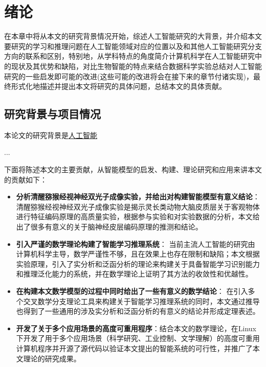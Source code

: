 

\chapter{绪论}
\label{cha:intro}

在本章中将从本文的研究背景情况开始，综述人工智能研究的大背景，并介绍本文要研究的学习和推理问题在人工智能领域对应的位置以及和其他人工智能研究分支方向的联系和区别，特别地，从学科特点的角度简介计算机科学在人工智能研究中的现状及其优势和缺陷，对比生物智能的特点来结合数据科学实验总结对人工智能研究的一些启发即可能的改进(这些可能的改进将会在接下来的章节付诸实现)，最终形式化地描述并提出本文将研究的具体问题，总结本文的具体贡献。


  
\section{研究背景与项目情况}
本论文的研究背景是\underline{人工智能}

...

下面将陈述本文的主要贡献，从智能模型的启发、构建、理论研究和应用来讲本文的贡献如下：

\begin{itemize}
  \item \textbf{分析清醒猕猴经视神经双光子成像实验，并给出对构建智能模型有意义结论}：清醒猕猴经视神经双光子成像实验是揭示灵长类动物大脑皮质层关于客观物体进行特征编码原理的高质量实验，根据参与实验和对实验数据的分析，本文给出了很多有意义的关于脑神经皮层编码原理的推测和结论。
  \item \textbf{引入严谨的数学理论构建了智能学习推理系统}： 当前主流人工智能的研究由计算机科学主导，数学严谨性不够，且在效果上也存在限制和缺陷；本文根据实验原理，引入了实分析和泛函分析的理论来构建关于具备智能学习识别能力和推理泛化能力的系统，并在数学理论上证明了其方法的收敛性和优越性。
  \item \textbf{在构建本文数学模型的过程中同时给出了一些有意义的数学结论}： 在引入多个交叉数学分支理论工具来构建关于智能学习推理系统的同时，本文通过推导也得到了一些通用的涉及实分析和泛函分析的有意义的结论并形成定理表述。
  \item \textbf{开发了关于多个应用场景的高度可重用程序}：结合本文的数学理论，在Linux下开发了用于多个应用场景（科学研究、工业控制、文学理解）的高度可重用计算机程序并开源了源代码以验证本文提出的智能系统的可行性，并推广了本文理论的研究成果。
\end{itemize}




